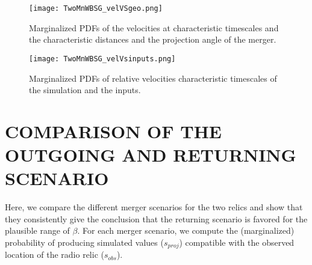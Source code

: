 \begin{figure*}
\begin{minipage}{180mm}
	\begin{center}
	\texttt{[image: TwoMnWBSG\_velVSgeo.png]}
	\caption{Marginalized PDFs of the velocities at characteristic timescales
		and the characteristic distances and the projection angle of the merger. }
	\end{center}
\end{minipage}
\end{figure*}
\begin{figure*}
\begin{minipage}{180mm}
	\begin{center}
	\texttt{[image: TwoMnWBSG\_velVsinputs.png]}
	\caption{Marginalized PDFs of relative velocities characteristic
	timescales of the simulation and the inputs.}
	\end{center}
\end{minipage}
\end{figure*}

\section{COMPARISON OF THE OUTGOING AND RETURNING SCENARIO}
\label{app:Bayes_factor}
%
Here, we compare the different merger scenarios for the two relics and show that they consistently give the conclusion that the returning
scenario is favored for the plausible range of $\beta$. For each merger
scenario, we compute
the (marginalized) probability of producing simulated
values ($s_{proj}$) compatible with the observed location of the radio
relic ($s_{obs}$). 


